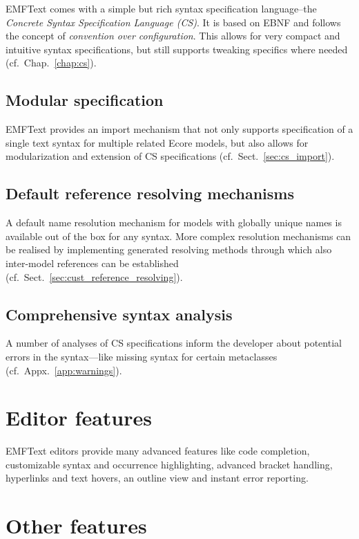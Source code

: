 EMFText comes with a simple but rich syntax specification language--the
\emph{Concrete Syntax Specification Language (CS)}. It is based on EBNF and 
follows the concept of \emph{convention over configuration}. This allows for 
very compact and intuitive syntax specifications, but still supports tweaking 
specifics where needed (cf.~Chap.~\ref{chap:cs}).

\subsection{Modular specification}

EMFText provides an import mechanism that not only supports specification of a
single text syntax for multiple related Ecore models, but also allows for
modularization and extension of CS specifications (cf.~Sect.~\ref{sec:cs_import}).

\subsection{Default reference resolving mechanisms}

A default name resolution mechanism for models with globally unique names is 
available out of the box for any syntax. More complex resolution mechanisms 
can be realised by implementing generated resolving methods through which also 
inter-model references can be established (cf.~Sect.~\ref{sec:cust_reference_resolving}).

\subsection{Comprehensive syntax analysis}

A number of analyses of CS specifications inform the developer about potential errors in the syntax---like missing syntax for certain metaclasses (cf.~Appx.~\ref{app:warnings}).


\section{Editor features}

EMFText editors provide many advanced features like code completion, 
customizable syntax and occurrence highlighting, advanced bracket handling,
hyperlinks and text hovers, an outline view and instant error reporting.

\section{Other features}

